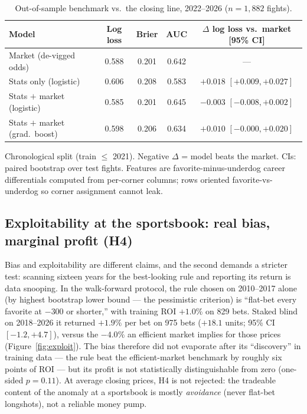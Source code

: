\documentclass[11pt]{article}
\newcommand{\devig}{de-vigged}
\begin{document}
\begin{table}[t]
\centering
\begin{threeparttable}
\caption{Out-of-sample benchmark vs.\ the closing line, 2022--2026 ($n=1{,}882$ fights).}
\label{tab:ml}
\begin{tabular}{lcccc}
\toprule
Model & Log loss & Brier & AUC & $\Delta$ log loss vs.\ market [95\% CI] \\
\midrule
Market (\devig{} odds)          & 0.588 & 0.201 & 0.642 & --- \\
Stats only (logistic)           & 0.606 & 0.208 & 0.583 & $+0.018$ $[+0.009, +0.027]$ \\
Stats $+$ market (logistic)     & 0.585 & 0.201 & 0.645 & $-0.003$ $[-0.008, +0.002]$ \\
Stats $+$ market (grad.\ boost) & 0.598 & 0.206 & 0.634 & $+0.010$ $[-0.000, +0.020]$ \\
\bottomrule
\end{tabular}
\begin{tablenotes}\footnotesize
\item Chronological split (train $\le$ 2021). Negative $\Delta$ = model beats the market. CIs:
paired bootstrap over test fights. Features are favorite-minus-underdog career differentials
computed from per-corner columns; rows oriented favorite-vs-underdog so corner assignment cannot
leak.
\end{tablenotes}
\end{threeparttable}
\end{table}

\subsection{Exploitability at the sportsbook: real bias, marginal profit (H4)}

Bias and exploitability are different claims, and the second demands a stricter test: scanning
sixteen years for the best-looking rule and reporting its return is data snooping. In the
walk-forward protocol, the rule chosen on 2010--2017 alone (by highest bootstrap lower bound ---
the pessimistic criterion) is ``flat-bet every favorite at $-300$ or shorter,'' with training ROI
$+1.0\%$ on 829 bets. Staked blind on 2018--2026 it returned $\mathbf{+1.9\%}$ per bet on 975
bets ($+18.1$ units; 95\% CI $[-1.2, +4.7]$), versus the $-4.0\%$ an efficient market implies for
those prices (Figure~\ref{fig:exploit}). The bias therefore did not evaporate after its
``discovery'' in training data --- the rule beat the efficient-market benchmark by roughly six
points of ROI --- but its profit is not statistically distinguishable from zero (one-sided
$p = 0.11$). At average closing prices, H4 is not rejected: the tradeable content of the anomaly
at a sportsbook is mostly \emph{avoidance} (never flat-bet longshots), not a reliable money pump.
\end{document}
